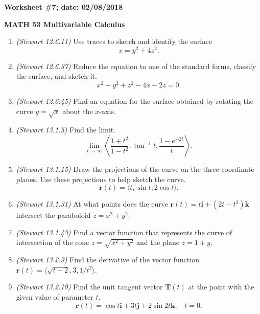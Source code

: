 \documentclass{article}
\begin{document}
{\bf Worksheet \#7; date: 02/08/2018}

{\bf MATH 53 Multivariable Calculus}

\begin{enumerate}
\item {\em (Stewart 12.6.11)} Use traces to sketch and identify the surface
\[
x = y^2 + 4z^2.
\]

\item {\em (Stewart 12.6.37)} Reduce the equation to one of the standard forms, classify the surface, and sketch it.
\[
x^2 - y^2 + z^2 - 4x - 2z = 0.
\]

\item {\em (Stewart 12.6.45)} Find an equation for the surface obtained by rotating the curve $y = \sqrt{x}$ about the $x$-axis.

\item {\em (Stewart 13.1.5)} Find the limit.
\[
\lim_{t \to \infty} \left\langle \frac{1+t^2}{1-t^2}, \tan^{-1} t, \frac{1 - e^{-2t}}{t}\right\rangle.
\]

\item {\em (Stewart 13.1.15)} Draw the projections of the curve on the three coordinate planes. Use these projections to help sketch the curve.
\[
\mathbf{r}(t) = \langle t, \sin t, 2 \cos t\rangle.
\]

\item {\em (Stewart 13.1.31)} At what points does the curve $\mathbf{r}(t) = t \mathbf{i} + (2t-t^2) \mathbf{k}$ intersect the paraboloid $z = x^2 + y^2$.

\item {\em (Stewart 13.1.43)} Find a vector function that represents the curve of intersection of the cone $z = \sqrt{x^2 + y^2}$ and the plane $z = 1 + y$.

\item {\em (Stewart 13.2.9)} Find the derivative of the vector function $\mathbf{r}(t) = \langle \sqrt{t-2}, 3, 1/t^2 \rangle$.

\item {\em (Stewart 13.2.19)} Find the unit tangent vector $\mathbf{T}(t)$ at the point with the given value of parameter $t$.
\[
\mathbf{r}(t) = \cos t \mathbf{i} + 3t \mathbf{j} + 2 \sin 2t \mathbf{k}, ~~~~ t = 0.
\]
\end{enumerate}
\end{document}
